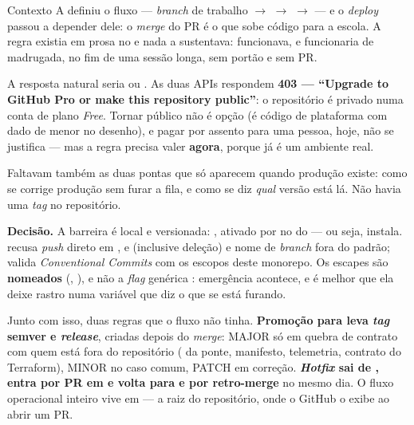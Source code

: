 \begin{especificacao}{Contexto}
A  definiu o fluxo --- \emph{branch} de trabalho \(\to\) 
\(\to\)  \(\to\)  --- e o \emph{deploy} passou a depender dele:
o \emph{merge} do PR é o que sobe código para a escola. A regra existia em prosa
no  e nada a sustentava:  funcionava, e
funcionaria de madrugada, no fim de uma sessão longa, sem portão e sem PR.

A resposta natural seria  ou . As duas APIs
respondem \textbf{403 --- \enquote{Upgrade to GitHub Pro or make this repository
public}}: o repositório é privado numa conta de plano \emph{Free}. Tornar
público não é opção (é código de plataforma com dado de menor no desenho), e
pagar por assento para uma pessoa, hoje, não se justifica --- mas a regra
precisa valer \textbf{agora}, porque  já é um ambiente real.

Faltavam também as duas pontas que só aparecem quando produção existe: como se
corrige produção sem furar a fila, e como se diz \emph{qual} versão está lá.
Não havia uma \emph{tag} no repositório.
\end{especificacao}

\textbf{Decisão.} A barreira é local e versionada: , ativado por
 no  do  --- ou seja,
 instala.  recusa \emph{push} direto em
,  e  (inclusive deleção) e nome de \emph{branch} fora
do padrão;  valida \emph{Conventional Commits} com os escopos
deste monorepo. Os escapes são \textbf{nomeados}
(, ), e
não a \emph{flag} genérica : emergência acontece, e é melhor
que ela deixe rastro numa variável que diz o que se está furando.

Junto com isso, duas regras que o fluxo não tinha. \textbf{Promoção para
 leva \emph{tag} semver e \emph{release}}, criadas depois do
\emph{merge}: MAJOR só em quebra de contrato com quem está fora do repositório
( da ponte, manifesto, telemetria, contrato do Terraform),
MINOR no caso comum, PATCH em correção. \textbf{\emph{Hotfix} sai de ,
entra por PR em  e volta para  e  por retro-merge} no
mesmo dia. O fluxo operacional inteiro vive em  --- a raiz
do repositório, onde o GitHub o exibe ao abrir um PR.

